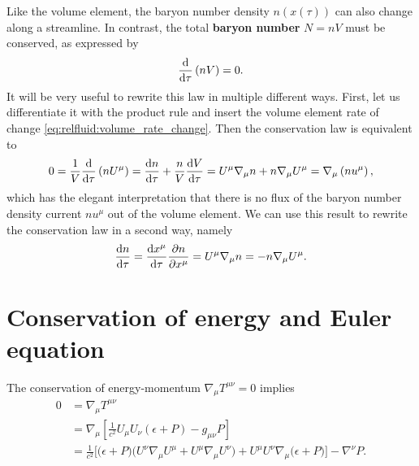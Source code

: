 Like the volume element, the baryon number density $n(x(\tau))$ can also change along a streamline.
In contrast, the total \textbf{baryon number} $N = n V$ must be conserved, as expressed by
\begin{equation}
	\odv*{\left( n V \right)}{\tau} = 0 .
\label{eq:relfluid:baryon_number_constant}
\end{equation}
It will be very useful to rewrite this law in multiple different ways.
First, let us differentiate it with the product rule and insert the volume element rate of change \eqref{eq:relfluid:volume_rate_change}.
Then the conservation law is equivalent to
\begin{equation}
	0 = \frac{1}{V} \odv*{\left( n U^\mu \right)}{\tau}
	  = \odv{n}{\tau} + \frac{n}{V} \odv{V}{\tau}
	  = U^\mu \nabla_\mu n + n \nabla_\mu U^\mu
	  = \nabla_\mu \left( n u^\mu \right) ,
\label{eq:relfluid:baryon_number_divergence}
\end{equation}
which has the elegant interpretation that there is no flux of the baryon number density current $n u^\mu$ out of the volume element.
We can use this result to rewrite the conservation law in a second way, namely
\begin{equation}
	\odv{n}{\tau} = \odv{x^\mu}{\tau} \pdv{n}{x^\mu}
	              = U^\mu \nabla_\mu n
	              = -n \nabla_\mu U^\mu .
\label{eq:relfluid:baryon_number_rate_change}
\end{equation}

\section{Conservation of energy and Euler equation}

The conservation of energy-momentum $\nabla_\mu T^{\mu \nu} = 0$ implies
\begin{equation}
\begin{split}
	0 &= \nabla_\mu T^{\mu \nu} \\
	  &= \nabla_\mu \left[ \frac{1}{c^2} U_\mu U_\nu (\epsilon + P) - g_{\mu \nu} P \right] \\
	  &= \frac{1}{c^2} \bigg[ \Big( \epsilon + P \Big) \Big( U^\nu \nabla_\mu U^\mu + U^\mu \nabla_\mu U^\nu \Big) + U^\mu U^\nu \nabla_\mu \Big( \epsilon + P \Big) \bigg] - \nabla^\nu P . \\
\end{split}
\label{eq:relfluid:conservation_energy_momentum}
\end{equation}

